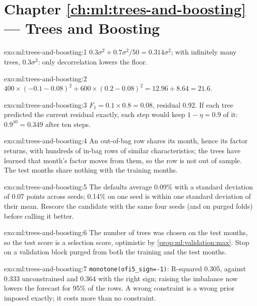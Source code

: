 \section*{Chapter \ref{ch:ml:trees-and-boosting} --- Trees and Boosting}

\begin{solution}{exo:ml:trees-and-boosting:1}
$0.3\sigma^2 + 0.7\sigma^2/50 = 0.314\sigma^2$; with infinitely many trees, $0.3\sigma^2$: only decorrelation lowers the
floor.
\end{solution}

\begin{solution}{exo:ml:trees-and-boosting:2}
$400\times(-0.1 - 0.08)^2 + 600\times(0.2 - 0.08)^2 = 12.96 + 8.64 = 21.6$.
\end{solution}

\begin{solution}{exo:ml:trees-and-boosting:3}
$F_1 = 0.1\times0.8 = 0.08$, residual 0.92. If each tree predicted the current residual exactly, each step would keep
$1 - \eta = 0.9$ of it: $0.9^{10} = 0.349$ after ten steps.
\end{solution}

\begin{solution}{exo:ml:trees-and-boosting:4}
An out-of-bag row shares its month, hence its factor returns, with hundreds of in-bag rows of similar characteristics;
the trees have learned that month's factor moves from them, so the row is not out of sample. The test months share
nothing with the training months.
\end{solution}

\begin{solution}{exo:ml:trees-and-boosting:5}
The defaults average 0.09\% with a standard deviation of 0.07 points across seeds; 0.14\% on one seed is within one
standard deviation of their mean. Rescore the candidate with the same four seeds (and on purged folds) before calling it
better.
\end{solution}

\begin{solution}{exo:ml:trees-and-boosting:6}
The number of trees was chosen on the test months, so the test score is a selection score, optimistic by
\cref{prop:ml:validation:max}. Stop on a validation block purged from both the training and the test months.
\end{solution}

\begin{solution}{exo:ml:trees-and-boosting:7}
\texttt{monotone(ofi5\_sign=-1)}: R-squared 0.305, against 0.333 unconstrained and 0.364 with the right sign; raising
the imbalance now lowers the forecast for 95\% of the rows. A wrong constraint is a wrong prior imposed exactly; it costs
more than no constraint.
\end{solution}

